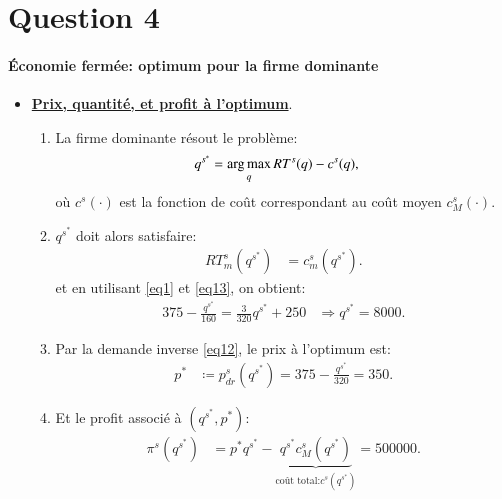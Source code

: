   \section{Question 4}
\frame{\sectionpage}
\begin{frame}
  [allowframebreaks]{\insertsection}
  \framesubtitle{Économie fermée: optimum pour la firme dominante}
  \begin{itemize}
  \item \underline{\textbf{Prix, quantité, et profit à l'optimum}}.
  \begin{enumerate}[$\cdot$]
  \item La firme dominante résout le problème:
  \begin{align*}
  q^{s^*} &=\argmax_q  RT^s(q) - c^s(q),
  \end{align*}
  où $c^s(\cdot)$ est la fonction de coût correspondant au coût moyen $c_M^s(\cdot)$. 
  \item $q^{s^*} $ doit alors satisfaire:
  \begin{align*}
   RT^s_m(q^{s^*}) &= c_m^s(q^{s^*}).
  \end{align*}
  et en utilisant \eqref{eq1} et \eqref{eq13}, on obtient:
  \begin{align*}
  375-  \frac{q^{s^*}}{160} = \frac{3}{320}q^{s^*} + 250&\Rightarrow  q^{s^*} = 8000.
  \end{align*}
  \item Par la demande inverse \eqref{eq12}, le prix à l'optimum est:
  \begin{align*}
  p^*&\coloneqq  p_{dr}^s(q^{s^*})  = 375 - \frac{q^{s^*}}{320} = 350.
  \end{align*}
  \item Et le profit associé à $(q^{s^*}, p^*)$:
  \begin{align*}
  \pi^s(q^{s^*}) &= p^*q^{s^*} - \underbrace{q^{s^*} c_M^s(q^{s^*})}_{\text{coût total:} c^s(q^{s^*})} = 500000.
  \end{align*}
  \end{enumerate}
  \end{itemize}
  \end{frame}
  
